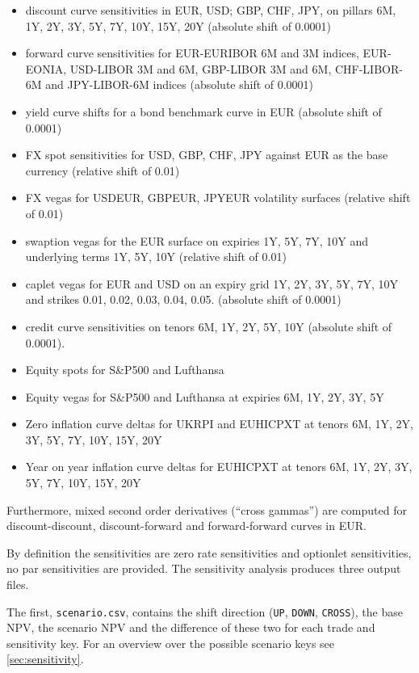 \begin{itemize}
\item discount curve sensitivities in EUR, USD; GBP, CHF, JPY, on pillars 6M, 1Y, 2Y, 3Y, 5Y, 7Y, 10Y, 15Y, 20Y (absolute shift of 0.0001)
\item forward curve sensitivities for EUR-EURIBOR 6M and 3M indices, EUR-EONIA, USD-LIBOR 3M and 6M, GBP-LIBOR 3M and
  6M, CHF-LIBOR-6M and JPY-LIBOR-6M indices (absolute shift of 0.0001)
\item yield curve shifts for a bond benchmark curve in EUR (absolute shift of 0.0001)
\item FX spot sensitivities for USD, GBP, CHF, JPY against EUR as the base currency (relative shift of 0.01)
\item FX vegas for USDEUR, GBPEUR, JPYEUR volatility surfaces (relative shift of 0.01)
\item swaption vegas for the EUR surface on expiries 1Y, 5Y, 7Y, 10Y and underlying terms 1Y, 5Y, 10Y (relative shift of 0.01)
\item caplet vegas for EUR and USD on an expiry grid 1Y, 2Y, 3Y, 5Y, 7Y, 10Y and strikes 0.01, 0.02, 0.03, 0.04,
  0.05. (absolute shift of 0.0001)
\item credit curve sensitivities on tenors 6M, 1Y, 2Y, 5Y, 10Y (absolute shift of 0.0001).
\item Equity spots for S\&P500 and Lufthansa
\item Equity vegas for S\&P500 and Lufthansa at expiries 6M, 1Y, 2Y, 3Y, 5Y
\item Zero inflation curve deltas for UKRPI and EUHICPXT at tenors 6M, 1Y, 2Y, 3Y, 5Y, 7Y, 10Y, 15Y, 20Y
\item Year on year inflation curve deltas for EUHICPXT at tenors 6M, 1Y, 2Y, 3Y, 5Y, 7Y, 10Y, 15Y, 20Y
\end{itemize}

Furthermore, mixed second order derivatives (``cross gammas'') are computed for discount-discount, discount-forward and
forward-forward curves in EUR.

By definition the sensitivities are zero rate sensitivities and optionlet sensitivities, no par sensitivities are
provided. The sensitivity analysis produces three output files.

The first, {\tt scenario.csv}, contains the shift
direction ({\tt UP}, {\tt DOWN}, {\tt CROSS}), the base NPV, the scenario NPV and the difference of these two for each
trade and sensitivity key. For an overview over the possible scenario keys see \ref{sec:sensitivity}.

